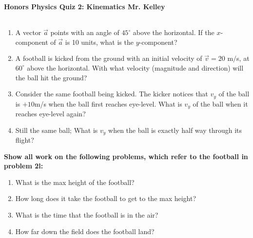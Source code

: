 \documentclass[12pt]{report}
\newcommand{ \probDir}[1]{{ \bf\small #1 \mbox{  }}}
\newcommand{ \breakList}{\setcounter{saveenum}{\value{enumi}} \end{enumerate}}
\newcommand{ \contList}{\begin{enumerate} \setcounter{enumi}{\value{saveenum}}}
\newcounter{saveenum}
\def \wspace{4cm}
\begin{document}
{\bf{Honors Physics} \hfill {Quiz 2: Kinematics} \hfill {Mr. Kelley}} \\ \\

\begin{multicols}{2}
\begin{enumerate}
\item A vector $\vec{a}$ points with an angle of $45^\circ$ above the horizontal.  If the $x$-component of $\vec{a}$ is 10 units, what is the $y$-component?
\vspace{\wspace}
\item A football is kicked from the ground with an initial velocity of $\vec{v} = 20$ m$/$s, at $60^\circ$ above the horizontal.  With what velocity (magnitude and direction) will the ball hit the ground?
\vspace{\wspace}
\item Consider the same football being kicked.  The kicker notices that $v_y$ of the ball is $+10$m/s when the ball first reaches eye-level.  What is $v_y$ of the ball when it reaches eye-level again?
\vspace{\wspace}
\item Still the same ball; What is $v_y$ when the ball is exactly half way through its flight?
\vspace{\wspace}
\breakList
\end{multicols}

\vspace{\wspace}

\probDir{Show all work on the following problems, which refer to the football in problem 2l:}
\contList
\item What is the max height of the football?
\vspace{\wspace}
\pagebreak
\item How long does it take the football to get to the max height?
\vspace{\wspace} \vspace{\wspace}
\item What is the time that the football is in the air?
\vspace{\wspace}
\item How far down the field does the football land?
\breakList
\vspace{\wspace}
\end{document}
